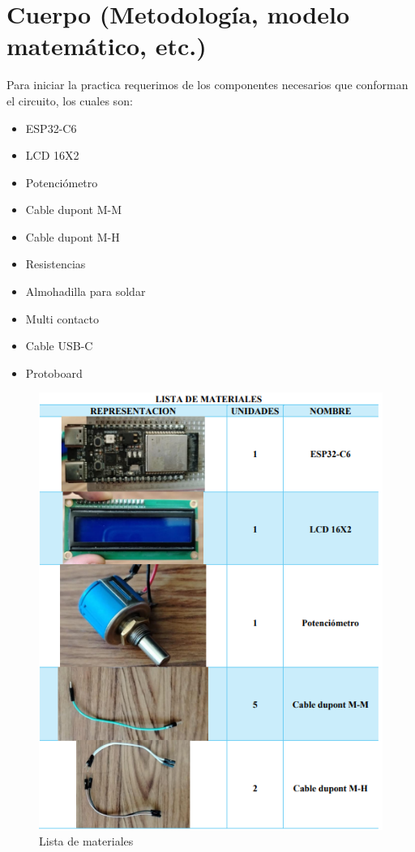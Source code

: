     \section{Cuerpo (Metodología, modelo matemático, etc.)}
    Para iniciar la practica requerimos de los componentes necesarios que conforman el circuito, los cuales son:
    \begin{itemize}
        \item ESP32-C6
        \item LCD 16X2
        \item Potenciómetro
        \item Cable dupont M-M
        \item Cable dupont M-H
        \item Resistencias
        \item Almohadilla para soldar
        \item Multi contacto
        \item Cable USB-C
        \item Protoboard 
    \end{itemize}
    \begin{figure}[H]
        \centering
        \includegraphics[trim = {0mm 0mm 0mm 0mm},clip,scale=0.5]{12/Img/listaDeMateriales1.png}
        \caption{Lista de materiales}
        \label{fig:listaDeMateriales1.png}
    \end{figure}
    
